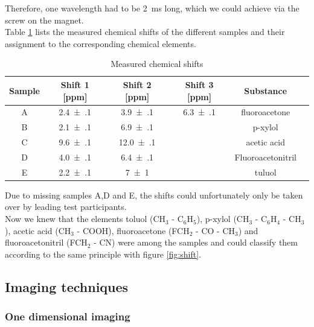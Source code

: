 Therefore, one wavelength had to be \SI{2}{\milli\second} long, which we could achieve via the screw on the magnet.\\
Table \ref{tab:shift} lists the measured chemical shifts of the different samples and their assignment to the corresponding chemical elements.
\begin{table}[ht]
\centering
\begin{tabular}{cccccc}
\toprule
Sample & Shift 1 [ppm] & Shift 2 [ppm] & Shift 3 [ppm] & Substance\\
\midrule
A & \num{2.4(1)} & \num{3.9(1)} & \num{6.3(1)} & fluoroacetone\\
B & \num{2.1(1)} & \num{6.9(1)} & & p-xylol\\
C & \num{9.6(1)} & \num{12.0(1)} & & acetic acid\\
D & \num{4.0(1)} & \num{6.4(1)} & & Fluoroacetonitril\\
E & \num{2.2(1)} & \num{7(1)} & & tuluol\\
\bottomrule
\end{tabular}
\caption{Measured chemical shifts}
\label{tab:shift}
\end{table}
Due to missing samples A,D and E, the shifts could unfortunately only be taken over by leading test participants.\\

Now we knew that the elements toluol (CH$_3$ - C$_6$H$_5$), p-xylol (CH$_3$ - C$_6$H$_4$ - CH$_3$), acetic acid (CH$_3$ - COOH), fluoroacetone (FCH$_2$ - CO - CH$_3$) and fluoroacetonitril (FCH$_2$ - CN) were among the samples and could classify them according to the same principle with figure \ref{fig:shift}.\\




\subsection{Imaging techniques}
\subsubsection{One dimensional imaging}

